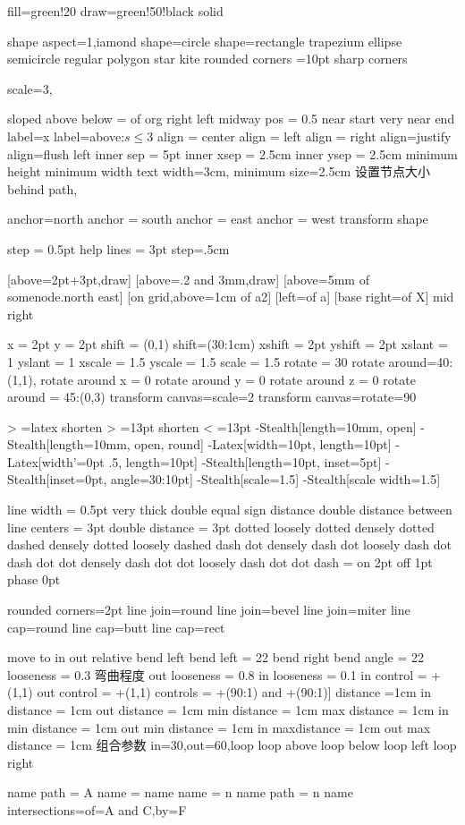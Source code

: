 fill=green!20
draw=green!50!black
solid


shape aspect=1,iamond
shape=circle
shape=rectangle
trapezium
ellipse
semicircle
regular polygon
star
kite
rounded corners =10pt
sharp corners 


scale=3,



sloped
above
below = of org
right
left
midway
pos = 0.5
near start
very near end
label=x
label=above:$s\le3$
align = center
align = left
align = right
align=justify
align=flush left
inner sep = 5pt
inner xsep = 2.5cm
inner ysep = 2.5cm
minimum height
minimum width
text width=3cm,
minimum size=2.5cm 设置节点大小
behind path,

anchor=north
anchor = south
anchor = east
anchor = west
transform shape

step = 0.5pt
help lines = 3pt
step=.5cm



[above=2pt+3pt,draw]
[above=.2 and 3mm,draw]
[above=5mm of somenode.north east]
[on grid,above=1cm of a2]
[left=of a]
[base right=of X]
mid right

x = 2pt
y = 2pt
shift = {(0,1)}
shift={(30:1cm)}
xshift = 2pt
yshift = 2pt
xslant = 1
yslant = 1
xscale = 1.5
yscale = 1.5
scale = 1.5
rotate = 30
rotate around={40:(1,1)},
rotate around x = 0
rotate around y = 0
rotate around z = 0
rotate around = {45:(0,3)}
transform canvas={scale=2}
transform canvas={rotate=90}


> =latex
shorten > =13pt
shorten < =13pt
-{Stealth[length=10mm, open]}
-{Stealth[length=10mm, open, round]}
-Latex[width=10pt, length=10pt]
-Latex[width’=0pt .5, length=10pt]
-Stealth[length=10pt, inset=5pt]
-Stealth[inset=0pt, angle=30:10pt]
-Stealth[scale=1.5]
-Stealth[scale width=1.5]


line width = 0.5pt
very thick
double equal sign distance
double distance between line centers = 3pt
double distance = 3pt
dotted
loosely dotted
densely dotted
dashed
densely dotted
loosely dashed
dash dot
densely dash dot
loosely dash dot
dash dot dot
densely dash dot dot
loosely dash dot dot
dash = on 2pt off 1pt phase 0pt




rounded corners=2pt
line join=round
line join=bevel
line join=miter
line cap=round
line cap=butt
line cap=rect


move to
in
out
relative
bend left
bend left = 22
bend right
bend angle = 22
looseness = 0.3 弯曲程度
out looseness = 0.8
in looseness = 0.1
in control = +(1,1)
out control = +(1,1)
controls = +(90:1) and +(90:1)]
distance =1cm
in distance = 1cm
out distance = 1cm
min distance = 1cm
max distance = 1cm
in min distance = 1cm
out min distance = 1cm
in maxdistance = 1cm
out max distance = 1cm
组合参数
in=30,out=60,loop
loop above
loop below
loop left
loop right





name path = A
name = name
name = n
name path = n
name intersections={of=A and C,by=F}  
